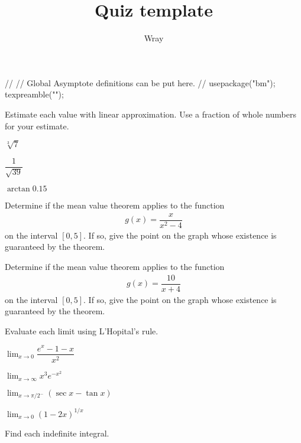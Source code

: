 \documentclass[addpoints, 12pt]{exam}
\title{Quiz template}
\author{Wray}
\begin{document}
\begin{asydef}
//
// Global Asymptote definitions can be put here.
//
usepackage("bm");
texpreamble("\def\V#1{\bm{#1}}");
\end{asydef}



\bigskip

\bigskip
Estimate each value with linear approximation.  Use a fraction of whole numbers for your estimate.

\begin{questions}

\question
$\sqrt[3]{7}$

\question
$\dfrac{1}{\sqrt{39}}$

\question
$\arctan 0.15$

\bigskip

\question
Determine if the mean value theorem applies to the function 
\begin{align*}
	g(x) = \dfrac{x}{x^2 - 4}
\end{align*}
on the interval $[0,5]$.  If so, give the point on the graph whose existence is guaranteed by the theorem.

\question
Determine if the mean value theorem applies to the function 
\begin{align*}
	g(x) = \dfrac{10}{x + 4}
\end{align*}
on the interval $[0,5]$.  If so, give the point on the graph whose existence is guaranteed by the theorem.

\bigskip

\end{questions}

Evaluate each limit using L'Hopital's rule.

\begin{questions}
\setcounter{question}{5}

\question
$\displaystyle \lim_{x \to 0} \dfrac{e^x-1-x}{x^2}$ 

\question
$\displaystyle \lim_{x \to \infty} x^3 e^{-x^2}$

\question
$\displaystyle \lim_{x \to \pi/2^-} \left( \sec x - \tan x \right)$ 

\question
$\displaystyle \lim_{x \to 0} \left(1 - 2x \right)^{1/x}$ 

\bigskip

\end{questions}

Find each indefinite integral.
\end{document}
